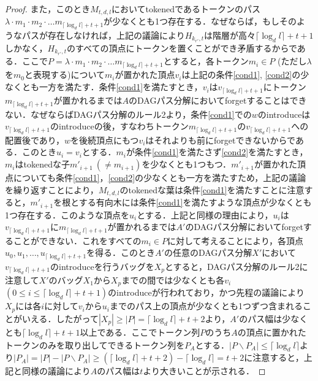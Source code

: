 \documentclass[master]{kuisthesis}		%
\theoremstyle{plain}
\theoremstyle{definition}
\begin{document}
\begin{proof}
また，このとき$M_{t, d, l}$においてtokenedであるトークンのパス$\lambda \cdot m_1 \cdot m_2 \cdot \dots m_{\lceil \log_d l \rceil +t+1}$が少なくとも1つ存在する．なぜならば，もしそのようなパスが存在しなければ，上記の議論により$H_{k_{r'}, t}$は階層が高々$\lceil \log_d l \rceil +t+1$しかなく，$H_{k_{r'}, t}$のすべての頂点にトークンを置くことができ矛盾するからである．ここで$P = \lambda \cdot m_1 \cdot m_2 \cdot \dots m_{\lceil \log_d l \rceil +t+1}$とすると，各トークン$m_i \in P$ (ただし$\lambda$を$m_0$と表現する)について$m_i$が置かれた頂点$v_i$は上記の条件\ref{cond1}, \ref{cond2}の少なくとも一方を満たす．条件\ref{cond1}を満たすとき，$v_i$は$v_{\lceil \log_d l \rceil +t+1}$にトークン$m_{\lceil \log_d l \rceil +t+1}$が置かれるまでは$A$のDAGパス分解においてforgetすることはできない．なぜならばDAGパス分解のルール2より，条件\ref{cond1}での$w$のintroduceは$v_{\lceil \log_d l \rceil +t+1}$のintroduceの後，すなわちトークン$m_{\lceil \log_d l \rceil +t+1}$の$v_{\lceil \log_d l \rceil +t+1}$への配置後であり，$w$を後続頂点にもつ$v_i$はそれよりも前にforgetできないからである．このとき$u_i=v_i$とする．$m_i$が条件\ref{cond1}を満たさず\ref{cond2}を満たすとき，$m_i$はtokenedな子$m'_{i+1}\ (\neq m_{i+1})$を少なくとも1つもつ．$m'_{i+1}$が置かれた頂点についても条件\ref{cond1}，\ref{cond2}の少なくとも一方を満たすため，上記の議論を繰り返すことにより，$M_{t, d, l}$のtokenedな葉は条件\ref{cond1}を満たすことに注意すると，$m'_{i+1}$を根とする有向木には条件\ref{cond1}を満たすような頂点が少なくとも1つ存在する．このような頂点を$u_i$とする．上記と同様の理由により，$u_i$は$v_{\lceil \log_d l \rceil +t+1}$に$m_{\lceil \log_d l \rceil +t+1}$が置かれるまでは$A'$のDAGパス分解においてforgetすることができない．これをすべての$m_i \in P$に対して考えることにより，各頂点$u_0, u_1, \dots, u_{\lceil \log_d l \rceil +t+1}$を得る．このとき$A'$の任意のDAGパス分解$X'$において$v_{\lceil \log_d l \rceil +t+1}$のintroduceを行うバッグを$X_p$とすると，DAGパス分解のルール2に注意して$X'$のバッグ$X_1$から$X_p$までの間では少なくとも各$v_i$ $(0 \leq i \leq \lceil \log_d l \rceil +t+1)$のintroduceが行われており，かつ先程の議論により$X_p$には各$i$に対して$v_i$から$u_i$までのパス上の頂点が少なくとも1つずつ含まれることがいえる．したがって$|X_p| \geq |P| = \lceil \log_d l \rceil +t+2$より，$A'$のパス幅は少なくとも$\lceil \log_d l \rceil +t+1$以上である．ここでトークン列$P$のうち$A$の頂点に置かれたトークンのみを取り出してできるトークン列を$P_A$とする．$|P \backslash P_A| \leq \lceil \log_d l \rceil$より$|P_A| = |P| - |P \backslash P_A| \geq (\lceil \log_d l \rceil +t+2) - \lceil \log_d l \rceil = t+2$に注意すると，上記と同様の議論により$A$のパス幅は$t$より大きいことが示される．
\end{proof}
\end{document}

